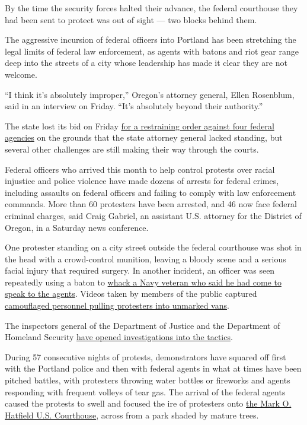 By the time the security forces halted their advance, the federal
courthouse they had been sent to protect was out of sight --- two blocks
behind them.

The aggressive incursion of federal officers into Portland has been
stretching the legal limits of federal law enforcement, as agents with
batons and riot gear range deep into the streets of a city whose
leadership has made it clear they are not welcome.

``I think it's absolutely improper,'' Oregon's attorney general, Ellen
Rosenblum, said in an interview on Friday. ``It's absolutely beyond
their authority.''

The state lost its bid on Friday
\href{https://www.nytimes3xbfgragh.onion/2020/07/24/us/portland-federal-jurisdiction-court-judge.html}{for
a restraining order against four federal agencies} on the grounds that
the state attorney general lacked standing, but several other challenges
are still making their way through the courts.

Federal officers who arrived this month to help control protests over
racial injustice and police violence have made dozens of arrests for
federal crimes, including assaults on federal officers and failing to
comply with law enforcement commands. More than 60 protesters have been
arrested, and 46 now face federal criminal charges, said Craig Gabriel,
an assistant U.S. attorney for the District of Oregon, in a Saturday
news conference.

One protester standing on a city street outside the federal courthouse
was shot in the head with a crowd-control munition, leaving a bloody
scene and a serious facial injury that required surgery. In another
incident, an officer was seen repeatedly using a baton to
\href{https://www.nytimes3xbfgragh.onion/2020/07/20/us/portland-protests-navy-christopher-david.html}{whack
a Navy veteran who said he had come to speak to the agents}. Videos
taken by members of the public captured
\href{https://www.nytimes3xbfgragh.onion/2020/07/17/us/portland-protests.html}{camouflaged
personnel pulling protesters into unmarked vans}.

The inspectors general of the Department of Justice and the Department
of Homeland Security
\href{https://www.nytimes3xbfgragh.onion/2020/07/23/us/seattle-protests-feds.html}{have
opened investigations into the tactics}.

During 57 consecutive nights of protests, demonstrators have squared off
first with the Portland police and then with federal agents in what at
times have been pitched battles, with protesters throwing water bottles
or fireworks and agents responding with frequent volleys of tear gas.
The arrival of the federal agents caused the protests to swell and
focused the ire of protesters onto
\href{https://www.nytimes3xbfgragh.onion/2020/07/22/us/portland-protests-courthouse.html}{the
Mark O. Hatfield U.S. Courthouse}, across from a park shaded by mature
trees.

